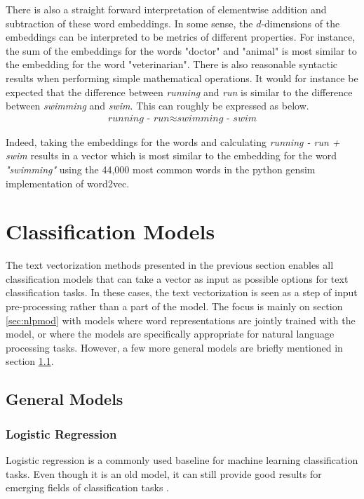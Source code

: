 There is also a straight forward interpretation of elementwise addition and subtraction of these word embeddings. In some sense, the $d$-dimensions of the embeddings can be interpreted to be metrics of different properties. For instance, the sum of the embeddings for the words "doctor" and "animal" is most similar to the embedding for the word "veterinarian". There is also reasonable syntactic results when performing simple mathematical operations. It would for instance be expected that the difference between \textit{running} and \textit{run} is similar to the difference between \textit{swimming} and \textit{swim}. This can roughly be expressed as below. 
\begin{align}
    \textit{running - run} \approx  \textit{swimming - swim}
\end{align}

Indeed, taking the embeddings for the words and calculating \textit{running - run + swim} results in a vector which is most similar to the embedding for the word \textit{"swimming"} using the 44,000 most common words in the python gensim implementation of word2vec.


\section{Classification Models}

The text vectorization methods presented in the previous section enables all classification models that can take a vector as input as possible options for text classification tasks. In these cases, the text vectorization is seen as a step of input pre-processing rather than a part of the model. The focus is mainly on section \ref{sec:nlpmod} with models where word representations are jointly trained with the model, or where the models are specifically appropriate for natural language processing tasks. However, a few more general models are briefly mentioned in section \ref{sec:genmod}. 

\subsection{General Models}\label{sec:genmod} 

\subsubsection*{Logistic Regression}

Logistic regression is a commonly used baseline for machine learning classification tasks. Even though it is an old model, it can still provide good results for emerging fields of classification tasks \citep{chollet2017deep}. 

